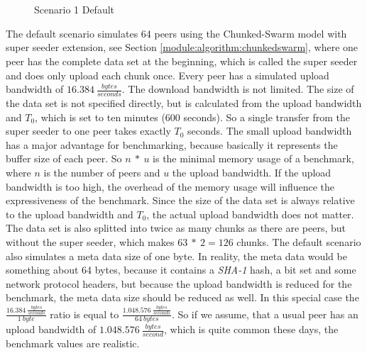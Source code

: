 \begin{figure}[!ht]
	\begin{center}	
		~ %

	 	~ %

		\caption{Scenario 1 Default}
		\label{fig:s1}
	\end{center}
\end{figure}




The default scenario simulates 64 peers using the Chunked-Swarm model with super seeder extension, see Section \ref{module:algorithm:chunkedswarm}, where one peer has the complete data set at the beginning, which is called the super seeder and does only upload each chunk once. Every peer has a simulated upload bandwidth of $16.384\:\frac{bytes}{seconds}$. The download bandwidth is not limited. The size of the data set is not specified directly, but is calculated from the upload bandwidth and $T_0$, which is set to ten minutes (600 seconds). So a single transfer from the super seeder to one peer takes exactly $T_0$ seconds. The small upload bandwidth has a major advantage for benchmarking, because basically it represents the buffer size of each peer. So $n\:*\:u$ is the minimal memory usage of a benchmark, where $n$ is the number of peers and $u$ the upload bandwidth. If the upload bandwidth is too high, the overhead of the memory usage will influence the expressiveness of the benchmark. Since the size of the data set is always relative to the upload bandwidth and $T_0$, the actual upload bandwidth does not matter. The data set is also splitted into twice as many chunks as there are peers, but without the super seeder, which makes $63\:*\:2=126$ chunks. The default scenario also simulates a meta data size of one byte. In reality, the meta data would be something about 64 bytes, because it contains a \emph{SHA-1} hash, a bit set and some network protocol headers, but because the upload bandwidth is reduced for the benchmark, the meta data size should be reduced as well. In this special case the $\frac{16.384\:\frac{bytes}{seconds}}{1\:byte}$ ratio is equal to $\frac{1.048.576\:\frac{bytes}{seconds}}{64\:bytes}$. So if we assume, that a usual peer has an upload bandwidth of $1.048.576\:\frac{bytes}{second}$, which is quite common these days, the benchmark values are realistic.

